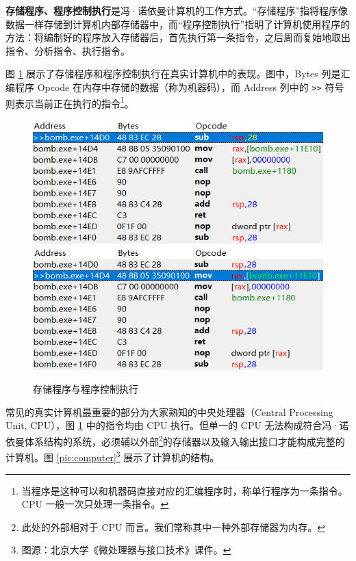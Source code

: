 \textbf{存储程序、程序控制执行}是冯·诺依曼计算机的工作方式。“存储程序”指将程序像数据一样存储到计算机内部存储器中，而“程序控制执行”指明了计算机使用程序的方法：将编制好的程序放入存储器后，首先执行第一条指令，之后周而复始地取出指令、分析指令、执行指令。

图 \ref{pic:asm} 展示了存储程序和程序控制执行在真实计算机中的表现。图中，Bytes 列是汇编程序 Opcode 在内存中存储的数据（称为机器码），而 Address 列中的 \lstinline{>>} 符号则表示当前正在执行的指令\footnote{当程序是这种可以和机器码直接对应的汇编程序时，称单行程序为一条指令。CPU 一般一次只处理一条指令。}。

\begin{figure}[ht]
	\centering
	\includegraphics[width=0.75\linewidth]{pic/asm-1.png}
	\includegraphics[width=0.75\linewidth]{pic/asm-2.png}
	\caption{存储程序与程序控制执行}
	\label{pic:asm}
\end{figure}

常见的真实计算机最重要的部分为大家熟知的中央处理器（Central Processing Unit, CPU），图 \ref{pic:asm} 中的指令均由 CPU 执行。但单一的 CPU 无法构成符合冯·诺依曼体系结构的系统，必须辅以外部\footnote{此处的外部相对于 CPU 而言。我们常称其中一种外部存储器为内存。}的存储器以及输入输出接口才能构成完整的计算机。图 \ref{pic:computer}\footnote{图源：北京大学《微处理器与接口技术》课件。} 展示了计算机的结构。

